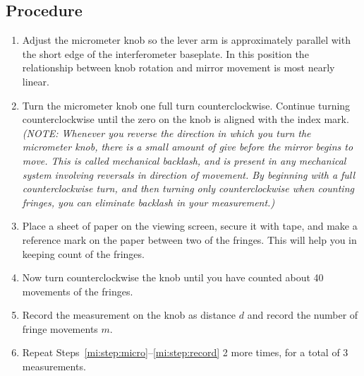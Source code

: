 \subsection{Procedure}

\begin{enumerate}
	\item\label{mi:step:micro} Adjust the micrometer knob so the lever arm is approximately parallel with the short edge of the interferometer
	baseplate. In this position the relationship between knob rotation and mirror movement is most nearly linear.
	
	\item Turn the micrometer knob one full turn counterclockwise. Continue turning counterclockwise until the zero on the
	knob is aligned with the index mark. \textit{(NOTE: Whenever you reverse the direction in which you turn the micrometer
	knob, there is a small amount of give before the mirror begins to move. This is called mechanical backlash, and is
	present in any mechanical system involving reversals in direction of movement. By beginning with a full
	counterclockwise turn, and then turning only counterclockwise when counting fringes, you can eliminate backlash
	in your measurement.)}

	\item Place a sheet of paper on the viewing screen, secure it with tape, and make a reference mark on the paper between
	two of the fringes. This will help you in keeping count of the fringes.
	
	\item Now turn counterclockwise the knob until you have counted about 40 movements of the fringes.
	
	\item\label{mi:step:record} Record the measurement on the knob as distance $d$ and record the number of fringe movements $m$.
	
	\item Repeat Steps~\ref{mi:step:micro}--\ref{mi:step:record} 2 more times, for a total of 3 measurements.
\end{enumerate}

